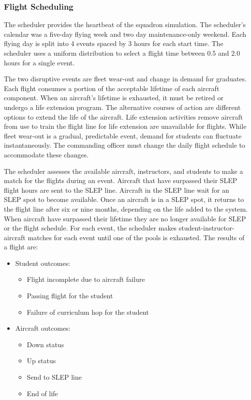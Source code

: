 \documentclass[preprint,12pt]{elsarticle}
\begin{document}
\subsubsection{Flight Scheduling}
The scheduler provides the heartbeat of the squadron simulation. The
scheduler's calendar was a five-day flying week and two day
maintenance-only weekend. Each flying day is split into 4 events
spaced by 3 hours for each start time. The scheduler uses a uniform
distribution to select a flight time between 0.5 and 2.0 hours for a
single event.

The two disruptive events
are fleet wear-out and change in demand for graduates. Each flight
consumes a portion of the acceptable lifetime of each aircraft
component. When an aircraft's lifetime is exhausted, it must be
retired or undergo a life extension program. The alternative courses
of action are different options to extend the life of the
aircraft. Life extension activities remove aircraft from use to train
the flight line for life extension are unavailable for flights. While
fleet wear-out is a gradual, predictable event, demand for students
can fluctuate instantaneously.  The commanding officer must change the
daily flight schedule to accommodate these changes.


The scheduler assesses the available aircraft, instructors,
and students to make a match for the flights during an event. Aircraft that have surpassed their SLEP flight hours are
sent to the SLEP line.  Aircraft in the SLEP line wait for an
SLEP spot to become available. Once an aircraft is in a SLEP spot, it
returns to the flight line after six or nine months, depending on the life
added to the system.  When aircraft have surpassed their lifetime
they are no longer available for SLEP
or the flight schedule. For each event, the scheduler makes
student-instructor-aircraft matches for each event until one of the
pools is exhausted. The results of a flight are:
\begin{itemize}
\item Student outcomes:
  \begin{itemize}
  \item Flight incomplete due to aircraft failure
  \item Passing flight  for the student
  \item Failure of curriculum hop for the student
  \end{itemize}
\item Aircraft outcomes:
  \begin{itemize}
  \item Down status
  \item Up status
  \item Send to SLEP line
  \item End of life
  \end{itemize}
\end{itemize}
\end{document}
